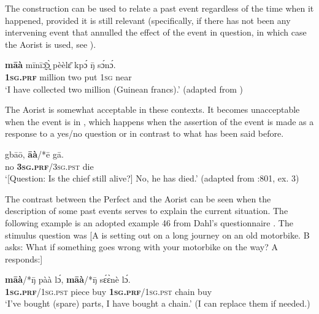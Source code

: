 \documentclass[output=paper,newtxmath,modfonts,nonflat,hidelinks]{langsci/langscibook}
\begin{document}
The  construction can be used to relate a past event regardless of the time when it happened, provided it is still relevant (specifically, if there has not been any intervening event that annulled the effect of the event in question, in which case the Aorist is used, see ). 

\begin{exe}
\ex
\gll \textbf{māà} mīnīɔ̰̄ɔ̰̀  pèèlɛ̄ kpɔ́ ŋ̄ sɔ́nɔ́.\\
\textbf{1\textsc{sg}.\textsc{prf}} million two put 1\textsc{sg} near\\
 `I have collected two million (Guinean francs).' (adapted from \citealt[803, ex. 42]{khachdahl2000})
\end{exe}

The Aorist is somewhat acceptable in these contexts. It becomes unacceptable when the event is in , which happens when the assertion of the event is made as a response to a yes/no question or in contrast to what has been said before.

\begin{exe} \ex
\gll gbāō, \textbf{āà}/*ē gā.\\
no \textbf{3\textsc{sg.prf}}/3\textsc{sg.pst} die\\
\glt `[Question: Is the chief still alive?] No, he has died.' (adapted from \citealt{khachdahl2000}:801, ex. 3)
\end{exe}

The contrast between the Perfect and the Aorist can be seen when the description of some past events serves to explain the current situation. The following example is an adopted example 46 from Dahl's questionnaire \citep[803]{khachdahl2000}. The stimulus question was [A is setting out on a long journey on an old motorbike. B asks: What if something goes wrong with your motorbike on the way? A responds:]

\begin{exe}\ex
\label{khachexmoto}
\gll \textbf{māà}/*ŋ̄ pàà lɔ́, \textbf{māà}/*ŋ̄ sɛ́ɛ̀nè lɔ́. \\
\textbf{1\textsc{sg.prf}}/1\textsc{sg.pst} piece buy \textbf{1\textsc{sg.prf}}/1\textsc{sg.pst} chain buy\\
\glt `I've bought (spare) parts, I have bought a chain.' (I can replace them if needed.)
\end{exe}
\end{document}
